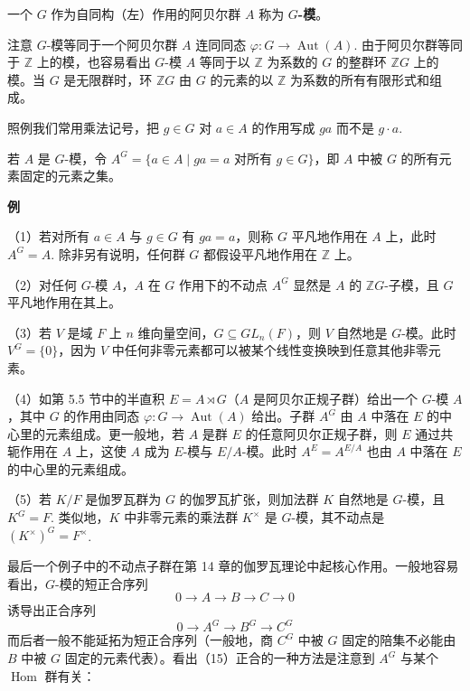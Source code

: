 \begin{definition}
一个 \(G\) 作为自同构（左）作用的阿贝尔群 \(A\) 称为 \textbf{\(G\)-模}。
\end{definition}

注意 \(G\)-模等同于一个阿贝尔群 \(A\) 连同同态 \(\varphi : G \to \operatorname{Aut}(A)\). 由于阿贝尔群等同于 \(\mathbb{Z}\) 上的模，也容易看出 \(G\)-模 \(A\) 等同于以 \(\mathbb{Z}\) 为系数的 \(G\) 的整群环 \(\mathbb{Z}G\) 上的模。当 \(G\) 是无限群时，环 \(\mathbb{Z}G\) 由 \(G\) 的元素的以 \(\mathbb{Z}\) 为系数的所有有限形式和组成。

照例我们常用乘法记号，把 \(g \in G\) 对 \(a \in A\) 的作用写成 \(ga\) 而不是 \(g \cdot a\).

\begin{definition}
若 \(A\) 是 \(G\)-模，令 \(A^G = \{a \in A \mid ga = a \text{ 对所有 } g \in G\}\)，即 \(A\) 中被 \(G\) 的所有元素固定的元素之集。
\end{definition}

\noindent\textbf{例}

（1）若对所有 \(a \in A\) 与 \(g \in G\) 有 \(ga = a\)，则称 \(G\) 平凡地作用在 \(A\) 上，此时 \(A^G = A\). 除非另有说明，任何群 \(G\) 都假设平凡地作用在 \(\mathbb{Z}\) 上。

（2）对任何 \(G\)-模 \(A\)，\(A\) 在 \(G\) 作用下的不动点 \(A^G\) 显然是 \(A\) 的 \(\mathbb{Z}G\)-子模，且 \(G\) 平凡地作用在其上。

（3）若 \(V\) 是域 \(F\) 上 \(n\) 维向量空间，\(G \subseteq GL_n(F)\)，则 \(V\) 自然地是 \(G\)-模。此时 \(V^G = \{0\}\)，因为 \(V\) 中任何非零元素都可以被某个线性变换映到任意其他非零元素。

（4）如第 5.5 节中的半直积 \(E = A \rtimes G\)（\(A\) 是阿贝尔正规子群）给出一个 \(G\)-模 \(A\)，其中 \(G\) 的作用由同态 \(\varphi : G \to \operatorname{Aut}(A)\) 给出。子群 \(A^G\) 由 \(A\) 中落在 \(E\) 的中心里的元素组成。更一般地，若 \(A\) 是群 \(E\) 的任意阿贝尔正规子群，则 \(E\) 通过共轭作用在 \(A\) 上，这使 \(A\) 成为 \(E\)-模与 \(E/A\)-模。此时 \(A^E = A^{E/A}\) 也由 \(A\) 中落在 \(E\) 的中心里的元素组成。

（5）若 \(K/F\) 是伽罗瓦群为 \(G\) 的伽罗瓦扩张，则加法群 \(K\) 自然地是 \(G\)-模，且 \(K^G = F\). 类似地，\(K\) 中非零元素的乘法群 \(K^\times\) 是 \(G\)-模，其不动点是 \((K^\times)^G = F^\times\).

最后一个例子中的不动点子群在第 14 章的伽罗瓦理论中起核心作用。一般地容易看出，\(G\)-模的短正合序列
\[
0 \to A \to B \to C \to 0
\]
诱导出正合序列
\[
0 \to A^G \to B^G \to C^G \tag{17.15}
\]
而后者一般不能延拓为短正合序列（一般地，商 \(C^G\) 中被 \(G\) 固定的陪集不必能由 \(B\) 中被 \(G\) 固定的元素代表）。看出（15）正合的一种方法是注意到 \(A^G\) 与某个 \(\operatorname{Hom}\) 群有关：

